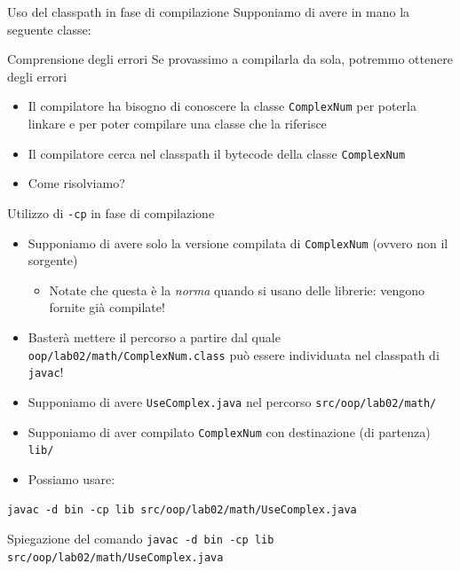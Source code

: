 \documentclass[xcolor=dvipsnames,presentation]{beamer}
\begin{document}
\begin{frame}{Uso del classpath in fase di compilazione}
   Supponiamo di avere in mano la seguente classe:
    \begin{block}{Comprensione degli errori}
        Se provassimo a compilarla da sola, potremmo ottenere degli errori
        \begin{itemize}
        \item Il compilatore ha bisogno di conoscere la classe \texttt{ComplexNum} per poterla
linkare e per poter compilare una classe che la riferisce
        \item Il compilatore cerca nel classpath il bytecode della classe \texttt{ComplexNum}
        \item Come risolviamo?
        \end{itemize}
    \end{block}
    \begin{block}{Utilizzo di \texttt{-cp} in fase di compilazione}
        \begin{itemize}
            \item Supponiamo di avere solo la versione compilata di \texttt{ComplexNum} (ovvero non il sorgente)
            \begin{itemize}
                \item Notate che questa è la \textit{norma} quando si usano delle librerie: vengono
                fornite già compilate!
            \end{itemize}
            \item Basterà mettere il percorso a partire dal quale \texttt{oop/lab02/math/ComplexNum.class} può essere individuata nel
            classpath di \texttt{javac}!
            \item Supponiamo di avere \texttt{UseComplex.java} nel percorso
            \texttt{src/oop/lab02/math/}
            \item Supponiamo di aver compilato \texttt{ComplexNum} con destinazione (di partenza) \texttt{lib/}
            \item Possiamo usare:
        \end{itemize}
        \alert{\texttt{javac -d bin -cp lib src/oop/lab02/math/UseComplex.java}}
    \end{block}
    \begin{block}{Spiegazione del comando}
        \texttt{javac -d bin -cp lib src/oop/lab02/math/UseComplex.java}

\end{block}
\end{frame}
\end{document}
